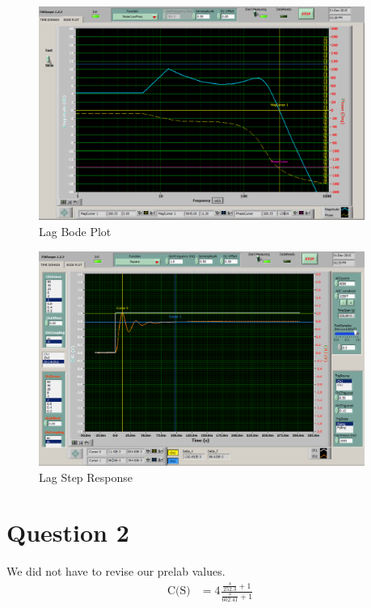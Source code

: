 \documentclass{article}
\begin{document}
\begin{figure}[!htbp]
    \centering
    \includegraphics[width=0.95\textwidth]{lag_bode.png}
    \caption{Lag Bode Plot}
\end{figure}

\newpage
\begin{figure}[!htbp]
    \centering
    \includegraphics[width=0.95\textwidth]{lag_step.png}
    \caption{Lag Step Response}
\end{figure}



\newpage
\section{Question 2} %
\label{sec:question_2}
We did not have to revise our prelab values.
\begin{align*}
\text{C(S)} &= 4\frac{\frac{s}{252.3} + 1}{\frac{s}{602.41} + 1}\\
\end{align*}
\end{document}
